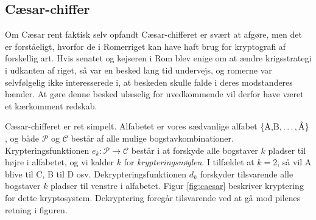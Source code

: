 \subsection*{Cæsar-chiffer}
Om Cæsar rent faktisk selv opfandt Cæsar-chifferet er svært at afgøre, men det er forståeligt, hvorfor de i Romerriget kan have haft brug for kryptografi af forskellig art. Hvis senatet og kejseren i Rom blev enige om at ændre krigsstrategi i udkanten af riget, så var en besked lang tid undervejs, og romerne var selvfølgelig ikke interesserede i, at beskeden skulle falde i deres modstanderes hænder. At gøre denne besked ulæselig for uvedkommende vil derfor have været et kærkomment redskab. 

Cæsar-chifferet er ret simpelt. Alfabetet er vores sædvanlige alfabet $\{\textnormal{A,B},\hdots,\textnormal{Å}\}$,
og både $\mathscr{P}$ og $\mathscr{C}$ består af alle mulige bogstavkombinationer. Krypteringsfunktionen $e_k:\mathscr{P} \to \mathscr{C}$ består i at forskyde alle bogstaver $k$ pladser til højre i alfabetet, og vi kalder $k$ for \textit{krypteringsnøglen}. I tilfældet at $k = 2$, så vil A blive til C, B til D osv. Dekrypteringsfunktionen $d_k$ forskyder tilsvarende alle bogstaver $k$ pladser til venstre i alfabetet. Figur \ref{fig:caesar} beskriver kryptering for dette kryptosystem. Dekryptering foregår tilsvarende ved at gå mod pilenes retning i figuren. 
